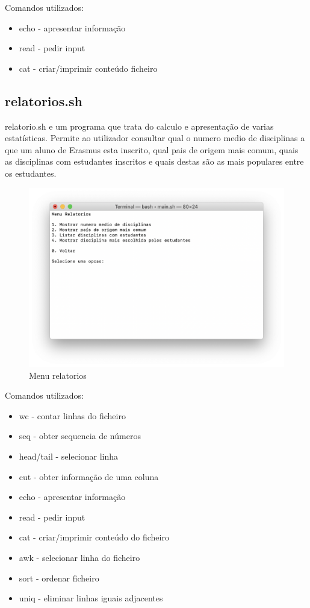 \documentclass{article}
\begin{document}
Comandos utilizados:

\begin{itemize}
\item echo - apresentar informação
\item read - pedir input
\item cat - criar/imprimir conteúdo ficheiro
\end{itemize}

\pagebreak{}
\subsection{relatorios.sh}
\label{sec:org28d85c0}

relatorio.sh e um programa que trata do calculo e apresentação de varias estatísticas.
Permite ao utilizador consultar qual o numero medio de disciplinas a que um aluno de Erasmus esta inscrito, qual pais de origem mais comum, quais as disciplinas com estudantes inscritos e quais destas são as mais populares entre os estudantes.

\begin{figure}[h]
\centering
\includegraphics[scale=0.4]{images/MenuRelatorios}
\caption{Menu relatorios}
\end{figure}

Comandos utilizados:

\begin{itemize}
\item wc - contar linhas do ficheiro
\item seq - obter sequencia de números
\item head/tail - selecionar linha
\item cut - obter informação de uma coluna
\item echo - apresentar informação
\item read - pedir input
\item cat - criar/imprimir conteúdo do ficheiro
\item awk - selecionar linha do ficheiro
\item sort - ordenar ficheiro
\item uniq - eliminar linhas iguais adjacentes
\end{itemize}
\end{document}
